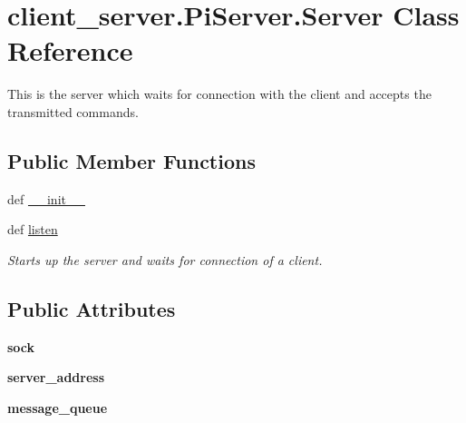 \hypertarget{classclient__server_1_1PiServer_1_1Server}{\section{client\+\_\+server.\+Pi\+Server.\+Server Class Reference}
\label{classclient__server_1_1PiServer_1_1Server}
}


This is the server which waits for connection with the client and accepts the transmitted commands.  


\subsection*{Public Member Functions}
\begin{DoxyCompactItemize}
\item 
def \hyperlink{classclient__server_1_1PiServer_1_1Server_a8c4e6a11ae8ad930a9bbf6bd911b4b92}{\+\_\+\+\_\+init\+\_\+\+\_\+}
\item 
def \hyperlink{classclient__server_1_1PiServer_1_1Server_a0419b922bca7db903b12e80a7d524c86}{listen}
\begin{DoxyCompactList}\small\item\em Starts up the server and waits for connection of a client. \end{DoxyCompactList}\end{DoxyCompactItemize}
\subsection*{Public Attributes}
\begin{DoxyCompactItemize}
\item 
\hypertarget{classclient__server_1_1PiServer_1_1Server_ad0460abeaacd622d0ae054bbcfb16615}{{\bfseries sock}}\label{classclient__server_1_1PiServer_1_1Server_ad0460abeaacd622d0ae054bbcfb16615}

\item 
\hypertarget{classclient__server_1_1PiServer_1_1Server_a59b0ca6049e6dc777b7aaf636b52e61e}{{\bfseries server\+\_\+address}}\label{classclient__server_1_1PiServer_1_1Server_a59b0ca6049e6dc777b7aaf636b52e61e}

\item 
\hypertarget{classclient__server_1_1PiServer_1_1Server_ad307f8055443426237ef1d7287231245}{{\bfseries message\+\_\+queue}}\label{classclient__server_1_1PiServer_1_1Server_ad307f8055443426237ef1d7287231245}

\end{DoxyCompactItemize}


